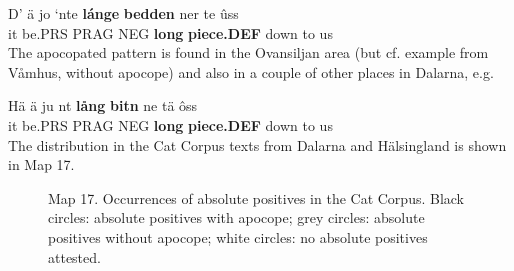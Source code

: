 
\ea\label{}
\gll D’  ä  jo  ‘nte  \textbf{lánge} \textbf{bedden} ner  te  ûss\\
it  be.PRS  PRAG  NEG  \textbf{long} \textbf{piece.DEF} down  to  us\\
\z
The apocopated pattern is found in the Ovansiljan area (but cf. example from Våmhus, without apocope) and also in a couple of other places in Dalarna, e.g.


\ea\label{}
\gll Hä  ä  ju  nt  \textbf{lång} \textbf{bitn} ne  tä  ôss\\
it  be.PRS  PRAG  NEG  \textbf{long} \textbf{piece.DEF} down  to  us\\The distribution in the Cat Corpus texts from Dalarna and Hälsingland is shown in Map 17.
\z 
\begin{figure}[h]



\label{bkm:Ref160012437}Map 17. Occurrences of absolute positives in the Cat Corpus. Black circles: absolute positives with apocope; grey circles: absolute positives without apocope; white circles: no absolute positives attested.




\end{figure}